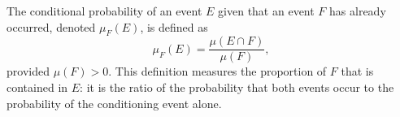 The conditional probability of an event $E$ given that an event $F$ has already occurred, denoted $\mu_F(E)$, is defined as
$$\mu_F(E) = \frac{\mu(E \cap F)}{\mu(F)},$$
provided $\mu(F) > 0$. This definition measures the proportion of $F$ that is contained in $E$: it is the ratio of the probability that both events occur to the probability of the conditioning event alone.
